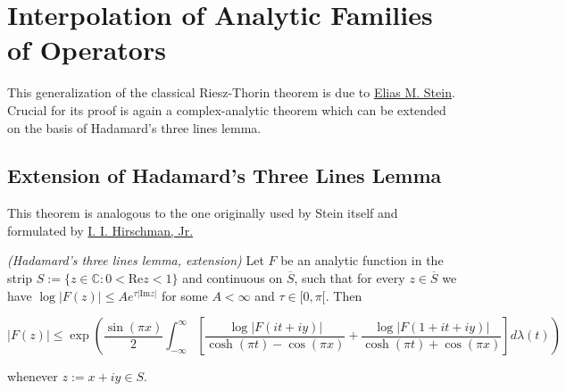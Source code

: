 \section{Interpolation of Analytic Families of Operators}
This generalization of the classical Riesz-Thorin theorem is due to \href{http://www.ams.org/journals/tran/1956-083-02/S0002-9947-1956-0082586-0/S0002-9947-1956-0082586-0.pdf}{Elias M. Stein}. Crucial for its proof is again a complex-analytic theorem which can be extended on the basis of Hadamard's three lines lemma.

\subsection{Extension of Hadamard's Three Lines Lemma}
This theorem is analogous to the one originally used by Stein itself and formulated by \href{http://download.springer.com/static/pdf/285/art\%253A10.1007\%252FBF02825637.pdf?originUrl=http\%3A\%2F\%2Flink.springer.com\%2Farticle\%2F10.1007\%2FBF02825637\&token2=exp=1470939579~acl=\%2Fstatic\%2Fpdf\%2F285\%2Fart\%25253A10.1007\%25252FBF02825637.pdf\%3ForiginUrl\%3Dhttp\%253A\%252F\%252Flink.springer.com\%252Farticle\%252F10.1007\%252FBF02825637*~hmac=d88bfe05b2cc8b0deed0f4781b8dfdd3701969606a6033727bfaf0c034cbd876}{ I. I. Hirschman, Jr.}

\vspace{2mm}

\begin{mdframed}
	\begin{lemma}\emph{(Hadamard's three lines lemma, extension)}
		Let $F$ be an analytic function in the strip $S := \{z \in \mathbb{C}: 0 < \mathrm{Re}z < 1\}$ and continuous on $\overline{S}$, such that for every $z \in \overline{S}$ we have $\log \vert F(z)\vert \leqslant A e^{\tau \vert \mathrm{Im}z \vert}$ for some $A < \infty$ and $\tau \in [0,\pi[$. Then

			\begin{equation*}
				\vert F(z) \vert \leqslant \exp\left( \frac{\sin(\pi x)}{2} \int_{-\infty}^\infty \left[ \frac{\log \vert F(it + iy)\vert}{\cosh(\pi t) - \cos(\pi x)} + \frac{\log \vert F(1 + it + iy)\vert}{\cosh(\pi t) + \cos(\pi x)} \right] d\lambda(t)\right)
			\end{equation*}

			whenever $z := x + iy \in S$.
	\end{lemma}
\end{mdframed}

